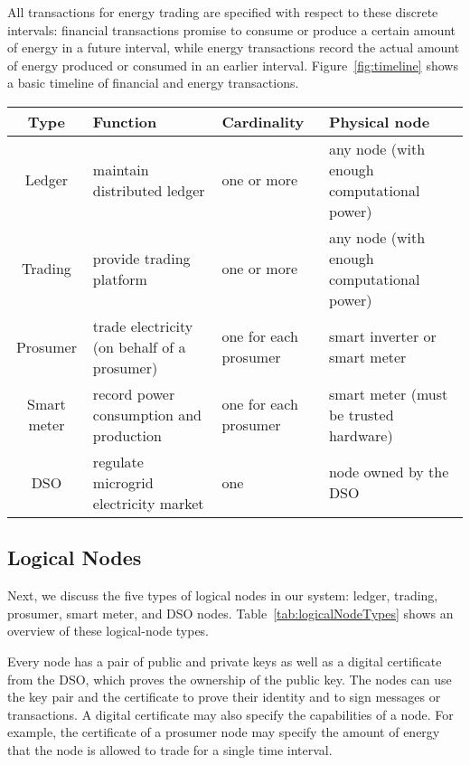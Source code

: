 \documentclass[chi_draft]{sigchi}
\begin{document}
All transactions for energy trading are specified with respect to these discrete intervals: financial transactions promise to consume or produce a certain amount of energy in a future interval, while energy transactions record the actual amount of energy produced or consumed in an earlier interval. 
Figure~\ref{fig:timeline} shows a basic timeline of financial and energy transactions.

\begin{table*}
\caption{Logical Node Types}
\label{tab:logicalNodeTypes}
\begin{tabular}{|c||l|l|l|}
\hline
\textbf{Type} & \textbf{Function} & \textbf{Cardinality} & \textbf{Physical node} \\
\hline\hline
\rowcolor{Gray} Ledger      & maintain distributed ledger                 & one or more           & any node (with enough computational power) \\ \hline
                Trading     & provide trading platform                    & one or more           & any node (with enough computational power) \\ \hline
\rowcolor{Gray} Prosumer    & trade electricity (on behalf of a prosumer) & one for each prosumer & smart inverter or smart meter \\ \hline
                Smart meter & record power consumption and production     & one for each prosumer & smart meter (must be trusted hardware) \\ \hline
\rowcolor{Gray} DSO         & regulate microgrid electricity market       & one                   & node owned by the DSO \\ \hline
\end{tabular}
\end{table*}

\subsection{Logical Nodes}

Next, we discuss the five types of logical nodes in our system: ledger, trading, prosumer, smart meter, and DSO nodes.
Table~\ref{tab:logicalNodeTypes} shows an overview of these logical-node types.

Every node has a pair of public and private keys as well as a digital certificate from the DSO, which proves the ownership of the public key.
The nodes can use the key pair and the certificate to prove their identity and to sign messages or transactions.
A digital certificate may also specify the capabilities of a node.
For example, the certificate of a prosumer node may specify the amount of energy that the node is allowed to trade for a single time interval.
\end{document}
